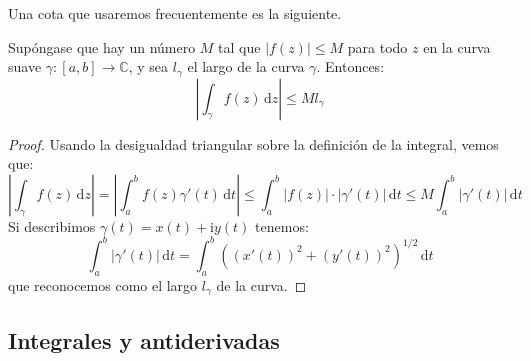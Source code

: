   Una cota que usaremos frecuentemente es la siguiente.
  \begin{lemma}
    \label{lem:complex-integral-bound}
    Supóngase que hay un número \(M\) tal que \(\lvert f(z) \rvert \le M\)
    para todo \(z\) en la curva suave
      \(\gamma \colon [a, b] \rightarrow \mathbb{C}\),
    y sea \(l_\gamma\) el largo de la curva \(\gamma\).
    Entonces:
    \begin{equation}
      \label{eq:complex-integral-bound}
      \left\lvert \int_\gamma f(z) \, \mathrm{d} z \right\rvert
	\le M l_\gamma
    \end{equation}
  \end{lemma}
  \begin{proof}
    Usando la desigualdad triangular
    sobre la definición de la integral,%
    vemos que:
    \begin{equation*}
      \left\lvert \int_\gamma f(z) \, \mathrm{d} z \right\rvert
	= \left\lvert \int_a^b f(z) \gamma'(t)
	    \, \mathrm{d} t \right\rvert
	\le \int_a^b
	      \lvert f(z) \rvert
		\cdot	\lvert \gamma'(t) \rvert \, \mathrm{d} t
	\le M \int_a^b \lvert \gamma'(t) \rvert \, \mathrm{d} t
    \end{equation*}
    Si describimos \(\gamma(t) = x(t) + \mathrm{i} y(t)\) tenemos:
    \begin{equation*}
      \int_a^b \lvert \gamma'(t) \rvert \, \mathrm{d} t
	= \int_a^b
	    \left(
	      \left( x'(t) \right)^2 + \left( y'(t) \right)^2
	    \right)^{1/2} \, \mathrm{d} t
    \end{equation*}
    que reconocemos como el largo \(l_\gamma\) de la curva.
  \end{proof}

\subsection{Integrales y antiderivadas}
\label{sec:complex-integral-antiderivative}

